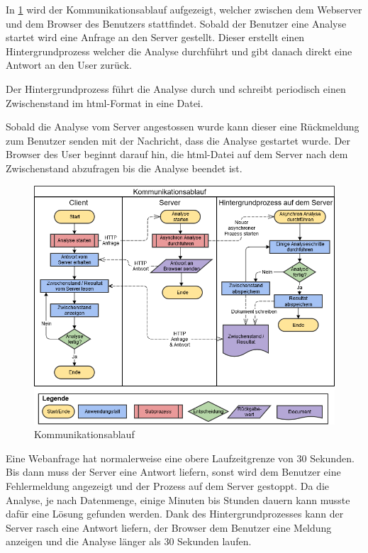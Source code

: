 In \cref{fig:proofofconcept:kommunikationsablauf:1} wird der Kommunikationsablauf aufgezeigt, welcher zwischen dem Webserver und dem Browser des Benutzers stattfindet. Sobald der Benutzer eine Analyse startet wird eine Anfrage an den Server gestellt. Dieser erstellt einen Hintergrundprozess welcher die Analyse durchführt und gibt danach direkt eine Antwort an den User zurück. 

Der Hintergrundprozess führt die Analyse durch und schreibt periodisch einen Zwischenstand im \gls{html}-Format in eine Datei.

Sobald die Analyse vom Server angestossen wurde kann dieser eine Rückmeldung zum Benutzer senden mit der Nachricht, dass die Analyse gestartet wurde. Der Browser des User beginnt darauf hin, die \gls{html}-Datei auf dem Server nach dem Zwischenstand abzufragen bis die Analyse beendet ist.
\begin{figure}[H]
	\RawFloats
	\centering
	\includegraphics[width=1\textwidth]{images/diagram-communication-flow}
	\caption{Kommunikationsablauf}
	\label{fig:proofofconcept:kommunikationsablauf:1}
\end{figure}

Eine Webanfrage hat normalerweise eine obere Laufzeitgrenze von 30 Sekunden. Bis dann muss der Server eine Antwort liefern, sonst wird dem Benutzer eine Fehlermeldung angezeigt und der Prozess auf dem Server gestoppt. Da die Analyse, je nach Datenmenge, einige Minuten bis Stunden dauern kann musste dafür eine Lösung gefunden werden. Dank des Hintergrundprozesses kann der Server rasch eine Antwort liefern, der Browser dem Benutzer eine Meldung anzeigen und die Analyse länger als 30 Sekunden laufen.

